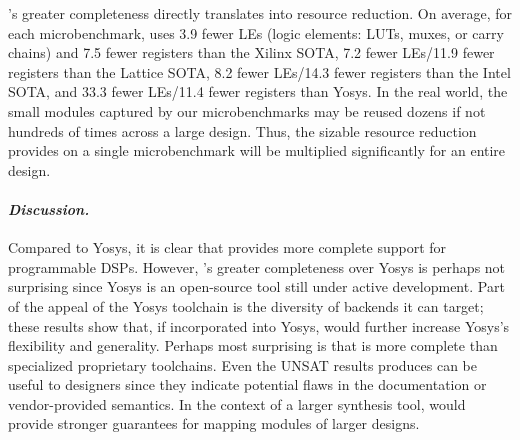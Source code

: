 \lr's greater completeness
  directly translates into resource reduction.
On average, for each microbenchmark,
  \lr uses 3.9 fewer LEs
  (logic elements: LUTs, muxes, or carry chains)
  and 7.5 fewer registers than the Xilinx SOTA,
  7.2 fewer LEs/11.9 fewer registers than the Lattice SOTA,
  8.2 fewer LEs/14.3 fewer registers than the Intel SOTA,
  and 33.3 fewer LEs/11.4 fewer registers than Yosys. 
In the real world, the small modules
  captured by our microbenchmarks
  may be reused dozens
  if not hundreds of times
  across a large design.
Thus, the sizable resource
  reduction \lr provides on a single
  microbenchmark
  will be multiplied significantly
  for an entire design.\tighten


\paragraph{\textnormal{\textit{\textbf{Discussion.}}}}
Compared to Yosys,
  it is clear that
  \lr provides more complete support
  for
  programmable DSPs.
However, \lr's greater completeness
  over Yosys
  is perhaps not surprising since 
  Yosys is an open-source tool
  still under active development.
Part of the appeal
  of the Yosys toolchain
  is the diversity of backends
  it can target;
  these results show that, if incorporated
  into Yosys, \lr
  would further increase
  Yosys's flexibility and generality.
Perhaps most surprising
  is that \lr is more complete
  than
  specialized proprietary toolchains. 
Even the UNSAT results \lr produces 
  can be useful to designers 
  since they indicate
  potential flaws
  in the documentation or vendor-provided semantics.
In the context of a larger
  synthesis tool, \lr
  would provide stronger
  guarantees for mapping
  modules of larger designs.






